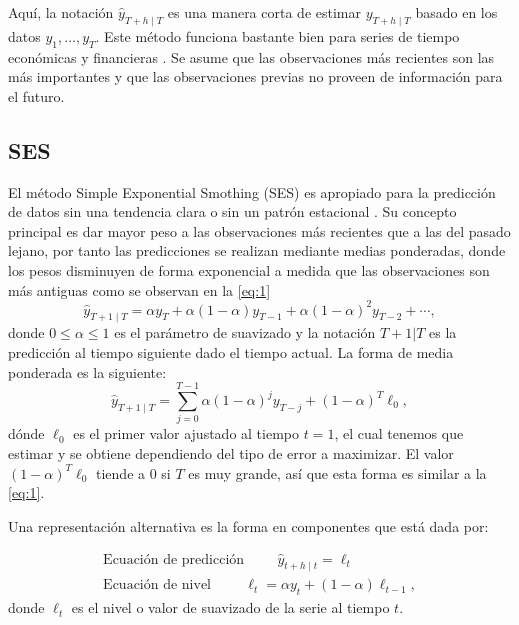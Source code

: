 Aquí, la notación $\hat{y}_{T+h \mid T}$ es una manera corta de estimar $y_{T+h \mid T}$ basado en los datos $y_{1}, \ldots, y_{T}$. Este método funciona bastante bien para series de tiempo económicas y financieras \parencite{hyndmanForecastingPrinciplesPractice2018}.
Se asume que las observaciones más recientes son las más importantes y que las observaciones previas no proveen de información para el futuro.

\subsection{SES}
El método Simple Exponential Smothing (SES) es apropiado para la predicción de datos sin una tendencia clara o sin un patrón estacional \parencite{hyndmanForecastingPrinciplesPractice2018}. Su concepto principal es dar mayor peso a las observaciones más recientes que a las del pasado lejano, por tanto las predicciones se realizan mediante medias ponderadas, donde los pesos disminuyen de forma exponencial a medida que las observaciones son más antiguas como se observan en la \cref{eq:1}
\begin{equation}
	\hat{y}_{T+1 \mid T}=\alpha y_{T}+\alpha(1-\alpha) y_{T-1}+\alpha(1-\alpha)^{2} y_{T-2}+\cdots,
	\label{eq:1}
\end{equation}
donde $0 \leq \alpha \leq 1$ es el parámetro de suavizado y la notación $T+1|T$ es la predicción al tiempo siguiente dado el tiempo actual. La forma de media ponderada es la siguiente:
\[\hat{y}_{T+1 \mid T}=\sum_{j=0}^{T-1} \alpha(1-\alpha)^{j} y_{T-j}+(1-\alpha)^{T} \ell_{0},\]
dónde $\ell_{0}$ es el primer valor ajustado al tiempo $t=1$, el cual tenemos que estimar y se obtiene dependiendo del tipo de error a maximizar. El valor $(1-\alpha)^{T} \ell_{0}$ tiende a $0$ si $T$ es muy grande, así que esta forma es similar a la \cref{eq:1}. 

Una representación alternativa es la forma en componentes que está dada por:

\begin{equation*}
	\begin{array}{lcl} 
		\textrm{Ecuación de predicción} \hspace{1cm} \hat{y}_{t+h \mid t}=\ell_{t}\\
		\textrm{Ecuación de nivel}\hspace{1cm} \ell_{t}=\alpha y_{t}+(1-\alpha) \ell_{t-1},
	\end{array} 
\end{equation*}
donde $\ell_{t}$ es el nivel o valor de suavizado de la serie al tiempo $t$.  

